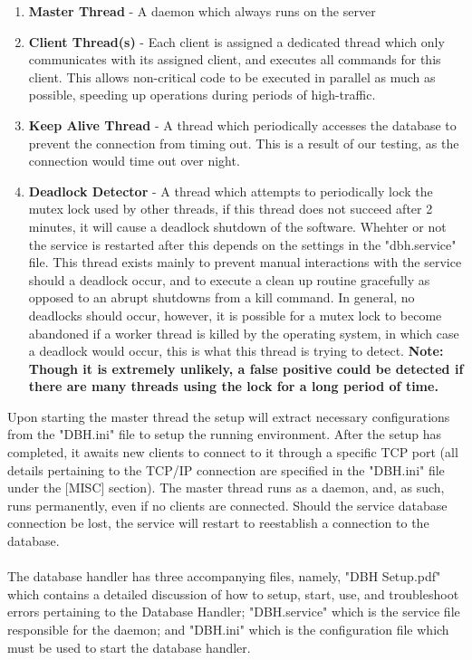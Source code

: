 \documentclass[letterpaper]{report}
\begin{document}
	\begin{enumerate}
		\item \textbf{Master Thread} - A daemon which always runs on the server
		\item \textbf{Client Thread(s)} - Each client is assigned a dedicated thread which only communicates with its assigned client, and executes all commands for this client. This allows non-critical code to be executed in parallel as much as possible, speeding up operations during periods of high-traffic.
		\item \textbf{Keep Alive Thread} - A thread which periodically accesses the database to prevent the connection from timing out. This is a result of our testing, as the connection would time out over night.
		\item \textbf{Deadlock Detector} - A thread which attempts to periodically lock the mutex lock used by other threads, if this thread does not succeed after 2 minutes, it will cause a deadlock shutdown of the software. Whehter or not the service is restarted after this depends on the settings in the "dbh.service" file. This thread exists mainly to prevent manual interactions with the service should a deadlock occur, and to execute a clean up routine gracefully as opposed to an abrupt shutdowns from a kill command. In general, no deadlocks should occur, however, it is possible for a mutex lock to become abandoned if a worker thread is killed by the operating system, in which case a deadlock would occur, this is what this thread is trying to detect. \textbf{Note: Though it is extremely unlikely, a false positive could be detected if there are many threads using the lock for a long period of time.}
	\end{enumerate}
	Upon starting the master thread the setup will extract necessary configurations from the "DBH.ini" file to setup the running environment. After the setup has completed, it awaits new clients to connect to it through a specific TCP port (all details pertaining to the TCP/IP connection are specified in the "DBH.ini" file under the [MISC] section). The master thread runs as a daemon, and, as such, runs permanently, even if no clients are connected. Should the service database connection be lost, the service will restart to reestablish a connection to the database. \\ \\ The database handler has three accompanying files, namely, "DBH Setup.pdf" which contains a detailed discussion of how to setup, start, use, and troubleshoot errors pertaining to the Database Handler; "DBH.service" which is the service file responsible for the daemon; and "DBH.ini" which is the configuration file which must be used to start the database handler.
\end{document}
